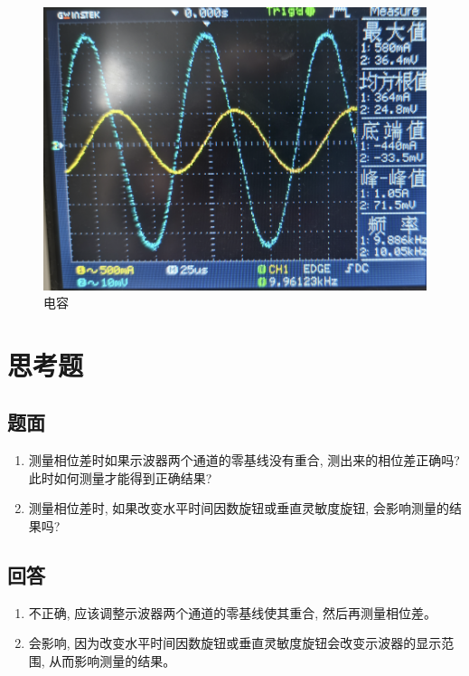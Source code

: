 \documentclass[10pt, a4paper]{article} %
\begin{document}
\begin{figure}[ht]
\begin{minipage}[ht]{0.3\textwidth}
    \end{minipage}
    \hfill
    \begin{minipage}[ht]{0.3\textwidth}
        \centering
        \includegraphics[width=\linewidth]{image/5.png}
        \caption{电容}
        \label{fig:side:e}
    \end{minipage}
\end{figure}

\newpage

\section{思考题}
\subsection{题面}
\begin{enumerate}[leftmargin=50pt,label=(\arabic*)] %
    \item 测量相位差时如果示波器两个通道的零基线没有重合, 测出来的相位差正确吗? 此时如何测量才能得到正确结果?
    \item 测量相位差时, 如果改变水平时间因数旋钮或垂直灵敏度旋钮, 会影响测量的结果吗?
\end{enumerate}
\subsection{回答}

\begin{enumerate}[leftmargin=50pt,label=(\arabic*)] %
    \item 不正确, 应该调整示波器两个通道的零基线使其重合, 然后再测量相位差。
    \item 会影响, 因为改变水平时间因数旋钮或垂直灵敏度旋钮会改变示波器的显示范围, 从而影响测量的结果。
\end{enumerate}
\end{document}
